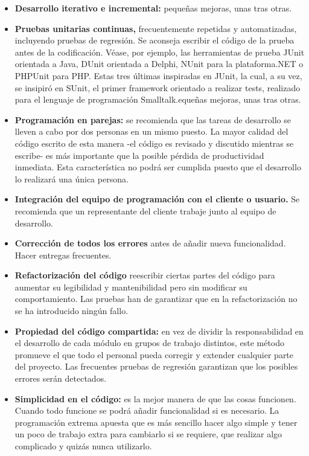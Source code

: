 \begin{itemize}
  \item \textbf{Desarrollo iterativo e incremental:} pequeñas mejoras, unas tras otras.
  \item \textbf{Pruebas unitarias continuas,} frecuentemente repetidas y automatizadas, incluyendo pruebas de regresión. Se aconseja escribir el código de la prueba antes de la codificación. Véase, por ejemplo, las herramientas de prueba JUnit orientada a Java, DUnit orientada a Delphi, NUnit para la plataforma.NET o PHPUnit para PHP. Estas tres últimas inspiradas en JUnit, la cual, a su vez, se insipiró en SUnit, el primer framework orientado a realizar tests, realizado para el lenguaje de programación Smalltalk.equeñas mejoras, unas tras otras.
  \item \textbf{Programación en parejas:} se recomienda que las tareas de desarrollo se lleven a cabo por dos personas en un mismo puesto. La mayor calidad del código escrito de esta manera -el código es revisado y discutido mientras se escribe- es más importante que la posible pérdida de productividad inmediata. Esta característica no podrá ser cumplida puesto que el desarrollo lo realizará una única persona.
  \item \textbf{Integración del equipo de programación con el cliente o usuario.} Se recomienda que un representante del cliente trabaje junto al equipo de desarrollo.
  \item \textbf{Corrección de todos los errores} antes de añadir nueva funcionalidad. Hacer entregas frecuentes.
  \item \textbf{Refactorización del código} reescribir ciertas partes del código para aumentar su legibilidad y mantenibilidad pero sin modificar su comportamiento. Las pruebas han de garantizar que en la refactorización no se ha introducido ningún fallo.
  \item \textbf{Propiedad del código compartida:} en vez de dividir la responsabilidad en el desarrollo de cada módulo en grupos de trabajo distintos, este método promueve el que todo el personal pueda corregir y extender cualquier parte del proyecto. Las frecuentes pruebas de regresión garantizan que los posibles errores serán detectados.
  \item \textbf{Simplicidad en el código: } es la mejor manera de que las cosas funcionen. Cuando todo funcione se podrá añadir funcionalidad si es necesario. La programación extrema apuesta que es más sencillo hacer algo simple y tener un poco de trabajo extra para cambiarlo si se requiere, que realizar algo complicado y quizás nunca utilizarlo.
\end{itemize}

